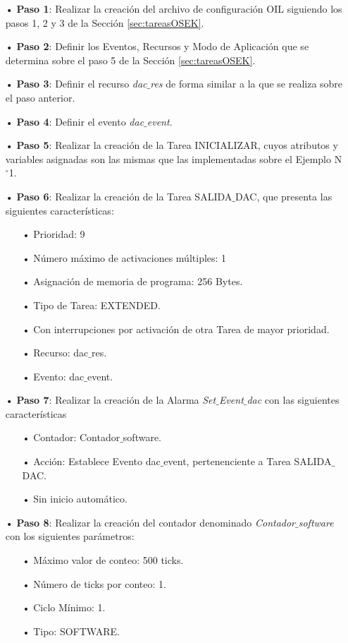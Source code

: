\documentclass[12pt,letterpaper]{article}
\begin{document}
\begin{enumerate}
\item[•]\textbf{Paso 1}: Realizar la creación del archivo de configuración OIL siguiendo los pasos 1, 2 y 3 de la Sección \ref{sec:tareasOSEK}.
\item[•]\textbf{Paso 2}: Definir los Eventos, Recursos y Modo de Aplicación que se determina sobre el paso 5 de la Sección \ref{sec:tareasOSEK}.
\item[•]\textbf{Paso 3}: Definir el recurso \textit{dac$\_$res} de forma similar a la que se realiza sobre el paso anterior.
\item[•]\textbf{Paso 4}: Definir el evento \textit{dac$\_$event}.
\item[•]\textbf{Paso 5}: Realizar la creación de la Tarea INICIALIZAR, cuyos atributos y variables asignadas son las mismas que las implementadas sobre el Ejemplo N$^{\circ}$1.

\item[•]\textbf{Paso 6}: Realizar la creación de la Tarea SALIDA$\_$DAC, que presenta las siguientes características:
\begin{enumerate}
\item[•]Prioridad: 9
\item[•]Número máximo de activaciones múltiples: 1
\item[•]Asignación de memoria de programa: 256 Bytes.
\item[•]Tipo de Tarea: EXTENDED.
\item[•]Con interrupciones por activación de otra Tarea de mayor prioridad.
\item[•]Recurso: dac$\_$res.
\item[•]Evento: dac$\_$event.
\end{enumerate}

\item[•]\textbf{Paso 7}: Realizar la creación de la Alarma \textit{Set$\_$Event$\_$dac} con las siguientes características
\begin{enumerate}
\item[•]Contador: Contador$\_$software.
\item[•]Acción: Establece Evento dac$\_$event, pertenenciente a Tarea SALIDA$\_$DAC.
\item[•]Sin inicio automático.
\end{enumerate}

\item[•]\textbf{Paso 8}: Realizar la creación del contador denominado \textit{Contador$\_$software} con los siguientes parámetros:
\begin{enumerate}
\item[•]Máximo valor de conteo: 500 ticks.
\item[•]Número de ticks por conteo: 1. 
\item[•]Ciclo Mínimo: 1.
\item[•]Tipo: SOFTWARE.
\end{enumerate}


\end{enumerate}
\end{document}
